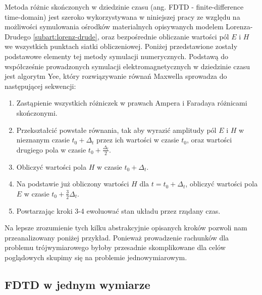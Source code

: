 \label{subart:fdtd}
Metoda różnic skończonych w dziedzinie czasu (ang. FDTD - finite-difference time-domain) jest szeroko wykorzystywana w niniejszej pracy ze względu na możliwości symulowania ośrodków materialnych opisywanych modelem Lorenza-Drudego \ref{subart:lorenz-drude}, oraz bezpośrednie obliczanie wartości pól $E$ i $H$ we wszystkich punktach siatki obliczeniowej. Poniżej przedstawione zostały podstawowe elementy tej metody symulacji numerycznych.
Podstawą do współcześnie prowadzonych symulacji elektromagnetycznych w dziedzinie czasu jest algorytm Yee\cite{1966ITAP14302Y}, który rozwiązywanie równań Maxwella sprowadza do następującej sekwencji:
\begin{enumerate}
\item Zastąpienie wszystkich różniczek w prawach Ampera i Faradaya różnicami skończonymi.
\item Przekształcić powstałe równania, tak aby wyrazić amplitudy pól $E$ i $H$ w nieznanym czasie $t_0 +  \Delta_t$ przez ich wartości w czasie $t_0$, oraz wartości drugiego pola w czasie $t_0+ \frac{\Delta_t}{2}$.
\item Obliczyć wartości pola $H$ w czasie $t_0 +  \Delta_t$.
\item Na podstawie już obliczony wartości $H$ dla $t=t_0+  \Delta_t$, obliczyć wartości pola $E$ w czasie $t_0 + \frac{3}{2} \Delta_t$.
\item Powtarzając kroki 3-4 ewoluować stan układu przez rządany czas.
\end{enumerate}
Na lepsze zrozumienie tych kilku abstrakcyjnie opisanych kroków pozwoli nam przeanalizowany poniżej przykład. Ponieważ prowadzenie rachunków dla problemu trójwymiarowego byłoby przesadnie skomplikowane dla celów poglądowych skupimy się na problemie jednowymiarowym.

\subsection{FDTD w jednym wymiarze}

